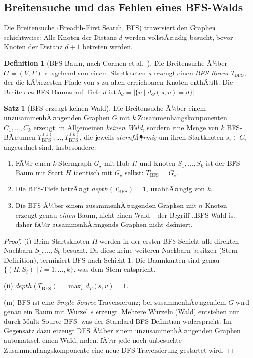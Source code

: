 ﻿\documentclass[12pt,a4paper]{article}
\theoremstyle{definition}
\newtheorem{definition}{Definition}[section]
\newtheorem{theorem}{Satz}[section]
\theoremstyle{remark}
\newcommand{\depth}{\mathit{depth}}
\begin{document}
\subsection{Breitensuche und das Fehlen eines BFS-Walds}

Die Breitensuche (Breadth-First Search, BFS) traversiert den Graphen
schichtweise: Alle Knoten der Distanz $d$ werden vollstÃ¤ndig besucht, bevor
Knoten der Distanz $d+1$ betreten werden.

\begin{definition}[BFS-Baum, nach Cormen et al.~\cite{Cormen2009}]
\label{def:bfsbaum}
Die Breitensuche Ã¼ber $G = (V, E)$ ausgehend von einem Startknoten $s$
erzeugt einen \emph{BFS-Baum} $T_{\mathrm{BFS}}$, der die kÃ¼rzesten Pfade
von $s$ zu allen erreichbaren Knoten enthÃ¤lt. Die Breite des BFS-Baums auf
Tiefe $d$ ist $b_d = |\{v \mid d_G(s,v) = d\}|$.
\end{definition}

\begin{theorem}[BFS erzeugt keinen Wald]
\label{thm:bfskeinwald}
Die Breitensuche Ã¼ber einem unzusammenhÃ¤ngenden Graphen $G$ mit $k$
Zusammenhangskomponenten $C_1, \ldots, C_k$ erzeugt im Allgemeinen
\emph{keinen Wald}, sondern eine Menge von $k$ BFS-BÃ¤umen
$T_{\mathrm{BFS}}^{(1)}, \ldots, T_{\mathrm{BFS}}^{(k)}$, die jeweils
\emph{sternfÃ¶rmig} um ihren Startknoten $s_i \in C_i$ angeordnet sind.
Insbesondere:
\begin{enumerate}[label=(\roman*)]
  \item FÃ¼r einen $k$-Stern\-graph $G_\star$ mit Hub $H$ und Knoten
        $S_1, \ldots, S_k$ ist der BFS-Baum mit Start $H$ identisch
        mit $G_\star$ selbst: $T_{\mathrm{BFS}} = G_\star$.
  \item Die BFS-Tiefe betrÃ¤gt $\depth(T_{\mathrm{BFS}}) = 1$, unabhÃ¤ngig
        von $k$.
  \item Die BFS Ã¼ber einem zusammenhÃ¤ngenden Graphen mit $n$ Knoten
        erzeugt genau \emph{einen} Baum, nicht einen Wald -- der Begriff
        ,,BFS-Wald\grqq{} ist daher fÃ¼r zusammenhÃ¤ngende Graphen
        nicht definiert.
\end{enumerate}
\end{theorem}

\begin{proof}
(i) Beim Startsknoten $H$ werden in der ersten BFS-Schicht alle direkten
Nachbarn $S_1, \ldots, S_k$ besucht. Da diese keine weiteren Nachbarn
besitzen (Stern-Definition), terminiert BFS nach Schicht 1.
Die Baumkanten sind genau $\{(H, S_i) \mid i = 1, \ldots, k\}$, was dem
Stern entspricht.

(ii) $\depth(T_{\mathrm{BFS}}) = \max_{v} d_{T}(s, v) = 1$.

(iii) BFS ist eine \emph{Single-Source}-Traversierung; bei zusammenhÃ¤ngendem
$G$ wird genau ein Baum mit Wurzel $s$ erzeugt. Mehrere Wurzeln (Wald)
entstehen nur durch Multi-Source-BFS, was der Standard-BFS-Definition
widerspricht. Im Gegensatz dazu erzeugt DFS Ã¼ber einem unzusammenhÃ¤ngenden
Graphen automatisch einen Wald, indem fÃ¼r jede noch unbesuchte Zusammenhangskomponente
eine neue DFS-Traversierung gestartet wird.
\end{proof}
\end{document}
